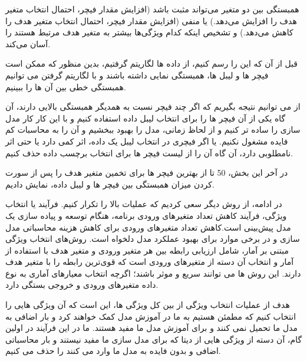 \documentclass[12pt,onecolumn,a4paper]{article}
\begin{document}
همبستگی بین دو متغیر می‌تواند مثبت باشد (افزایش مقدار فیچر، احتمال انتخاب متغیر هدف را افزایش می‌دهد.) یا منفی (افزایش مقدار فیچر، احتمال انتخاب متغیر هدف را کاهش می‌دهد.) و  تشخیص اینکه کدام ویژگی‌ها بیشتر به متغیر هدف مرتبط هستند را آسان می‌کند.

قبل از آن که این  را رسم کنیم، از داده ها لگاریتم گرفتیم، بدین منظور که ممکن است فیچر ها و لیبل ها، همبستگی نمایی داشته باشند و با لگاریتم گرفتن می توانیم همبستگی خطی بین آن ها را ببینیم. 

از  می توانیم نتیجه بگیریم که اگر چند فیچر نسبت به همدیگر همبستگی بالایی دارند، آن گاه یکی از آن فیچر ها را برای انتخاب لیبل داده استفاده کنیم و با این کار کار مدل سازی را ساده تر کنیم و از لحاظ زمانی، مدل را بهبود ببخشیم و آن را به محاسبات کم فایده مشغول نکنیم. یا اگر فیچری در انتخاب لیبل یک داده، اثر کمی دارد یا حتی اثر نامطلوبی دارد، آن گاه آن را از لیست فیچر ها برای انتخاب برچسب داده حذف کنیم.

در آخر این بخش، 50 تا از بهترین فیچر ها برای تخمین متغیر هدف را پس از سورت کردن میزان همبستگی بین فیچر ها و لیبل داده، نمایش دادیم.

در ادامه، از روش دیگر  سعی کردیم که عملیات بالا را تکرار کنیم.
فرآیند  یا انتخاب ویژگی، فرآیند کاهش تعداد متغیرهای ورودی برنامه، هنگام توسعه و پیاده سازی یک مدل پیش‌بینی است.کاهش تعداد متغیرهای ورودی برای کاهش هزینه محاسباتی مدل سازی و در برخی موارد برای بهبود عملکرد مدل دلخواه است. روش‌های انتخاب ویژگی مبتنی بر آمار، شامل ارزیابی رابطه بین هر متغیر ورودی و متغیر هدف با استفاده از آمار و انتخاب آن دسته از متغیرهای ورودی است که قوی‌ترین رابطه را با متغیر هدف دارند. این روش ها می توانند سریع و موثر باشند؛ اگرچه انتخاب معیارهای آماری به نوع داده متغیرهای ورودی و خروجی بستگی دارد.

هدف از عملیات انتخاب ویژگی از بین کل ویژگی ها، این است که آن ویژگی هایی را انتخاب کنیم که مطمئن هستیم به ما در آموزش مدل کمک خواهند کرد و بار اضافی به مدل ما تحمیل نمی کنند و برای آموزش مدل ما مفید هستند.
ما در این فرآیند در اولین گام، آن دسته از ویژگی هایی از دیتا که برای مدل سازی ما مفید نیستند و بار محاسباتی اضافی و بدون فایده به مدل ما وارد می کنند را حذف می کنیم. 
\end{document}
